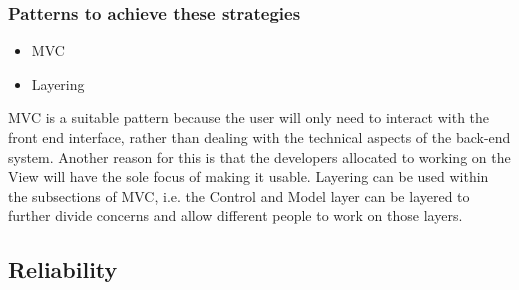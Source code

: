 \documentclass[a4paper,12pt]{article}
\begin{document}
 \subsubsection{Patterns to achieve these strategies}
 \begin{itemize}
 \item MVC
 \item Layering
\end{itemize}
MVC is a suitable pattern because the user will only need to interact with the front end interface, rather than dealing with the technical aspects of the back-end system. Another reason for this is that the developers allocated to working on the View will have the sole focus of making it usable.
Layering can be used within the subsections of MVC, i.e. the Control and Model layer can be layered to further divide concerns and allow different people to work on those layers.


\subsection{Reliability}
\end{document}
